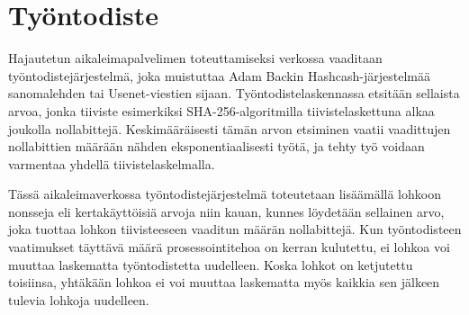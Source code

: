 \documentclass{article}
\begin{document}
\section{Työntodiste}

Hajautetun aikaleimapalvelimen toteuttamiseksi verkossa vaaditaan työn\-to\-dis\-te\-jär\-jes\-tel\-mä, joka muistuttaa Adam Backin Hashcash-järjestelmää \cite{6} sanomalehden tai Usenet-viestien sijaan. Työntodistelaskennassa etsitään sellaista arvoa, jonka tiiviste esimerkiksi SHA-256-algoritmilla tiivistelaskettuna alkaa joukolla nollabittejä. Keskimääräisesti tämän arvon etsiminen vaatii vaadittujen nollabittien määrään nähden eksponentiaalisesti työtä, ja tehty työ voidaan varmentaa yhdellä  tiivistelaskelmalla.

Tässä ai\-ka\-lei\-ma\-ver\-kos\-sa työn\-to\-dis\-te\-jär\-jes\-tel\-mä toteutetaan lisäämällä lohkoon nons\-se\-ja  eli kertakäyttöisiä arvoja niin kauan, kunnes löydetään sellainen arvo, joka tuottaa loh\-kon tiivisteeseen vaaditun määrän nollabittejä. Kun työn\-to\-dis\-teen vaatimukset täyttävä määrä prosessointitehoa on kerran kulutettu, ei lohkoa voi muuttaa laskematta työntodistetta uudelleen. Koska lohkot on ketjutettu toisiinsa, yhtäkään lohkoa ei voi muuttaa laskematta myös kaikkia sen jälkeen tulevia lohkoja uudelleen.
\end{document}
